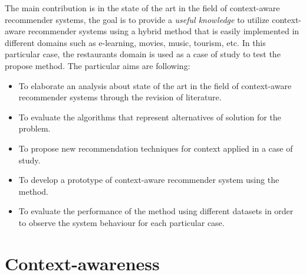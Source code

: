 The main contribution is in the state of the art in the field of
context-aware recommender systems, the goal is to provide a
\textit{useful knowledge} to utilize context-aware recommender systems
using a hybrid method that is easily implemented in different domains
such as e-learning, movies, music, tourism, etc. In this particular
case, the restaurants domain is used as a case of study to  test the
propose method.   The particular aims are following:
\begin{itemize}  
\item To elaborate an analysis about state of the art in the field
of context-aware recommender systems through  the revision of
literature. 
\item To evaluate the algorithms that represent alternatives of 
solution for the problem. 
\item To propose new recommendation techniques for context applied 
in a case of study.  
\item To develop a prototype of context-aware recommender system 
using the method. 
\item To evaluate the performance of the method using 
different datasets in order to observe the system behaviour 
for each particular case.
\end{itemize} 

\section{Context-awareness}

